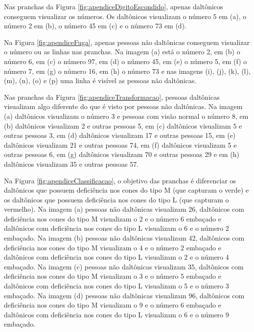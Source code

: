 \documentclass[	12pt, Times, openright, twoside, a4paper, english, brazil]{abntex2}
\begin{document}
\begin{apendicesenv}
Nas pranchas da Figura \ref{fig:apendiceDigitoEscondido}, apenas daltônicos conseguem visualizar os números. Os daltônicos visualizam o número 5 em (a), o número 2 em (b), o número 45 em (c) e o número 73 em (d).

Na Figura \ref{fig:apendiceFuga},  apenas pessoas não daltônicas conseguem visualizar o número ou as linhas nas pranchas. Na imagem (a) está o número 2, em (b) o número 6, em (c) o número 97, em (d) o número 45, em (e) o número 5, em (f) o número 7, em (g) o número 16, em (h) o número 73 e nas imagens (i), (j), (k), (l), (m), (n), (o) e (p) uma linha é visível as pessoas não daltônicas.

Nas pranchas da Figura \ref{fig:apendiceTransformacao}, pessoas daltônicas visualizam algo diferente do que é visto por pessoas não daltônicas. Na imagem (a) daltônicos visualizam o número 3 e pessoas com visão normal o número 8, em (b) daltônicos visualizam 2 e outras pessoas 5, em (c) daltônicos visualizam 5 e outras pessoas 3, em (d) daltônicos visualizam 17 e outras pessoas 15, em (e) daltônicos visualizam 21 e outras pessoas 74, em (f) daltônicos visualizam 5 e outras pessoas 6, em (g) daltônicos visualizam 70 e outras pessoas 29 e em (h) daltônicos visualizam 35 e outras pessoas 57.

Na Figura \ref{fig:apendiceClassificacao}, o objetivo das pranchas é diferenciar os daltônicos que possuem deficiência nos cones do tipo M (que capturam o verde) e os daltônicos que possuem deficiência nos cones do tipo L (que capturam o vermelho). Na imagem (a) pessoas não daltônicas visualizam 26, daltônicos com deficiência nos cones do tipo M visualizam o 2 e o número 6 embaçado e daltônicos com deficiência nos cones do tipo L visualizam o 6 e o número 2 embaçado. Na imagem (b) pessoas não daltônicas visualizam 42, daltônicos com deficiência nos cones do tipo M visualizam o 4 e o número 2 embaçado e daltônicos com deficiência nos cones do tipo L visualizam o 2 e o número 4 embaçado. Na imagem (c) pessoas não daltônicas visualizam 35, daltônicos com deficiência nos cones do tipo M visualizam o 3 e o número 5 embaçado e daltônicos com deficiência nos cones do tipo L visualizam o 5 e o número 3 embaçado. Na imagem (d) pessoas não daltônicas visualizam 96, daltônicos com deficiência nos cones do tipo M visualizam o 9 e o número 6 embaçado e daltônicos com deficiência nos cones do tipo L visualizam o 6 e o número 9 embaçado. 


\end{apendicesenv}
\end{document}
